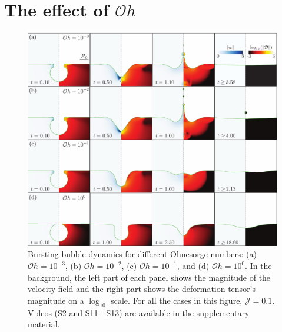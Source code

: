 \documentclass[final]{jfm}
\begin{document}
\section{The effect of $\mathcal{O}h$}\label{App::OhsVariation}
 \begin{figure}
	\centerline{\includegraphics[width=\linewidth]{Figures/FigureB1_Ohvariation-eps-converted-to.pdf}}%
	\caption{Bursting bubble dynamics for different Ohnesorge numbers: (a) $\mathcal{O}h = 10^{-3}$, (b) $\mathcal{O}h = 10^{-2}$, (c) $\mathcal{O}h = 10^{-1}$, and (d) $\mathcal{O}h = 10^{0}$. In the background, the left part of each panel shows the magnitude of the velocity field and the right part shows the deformation tensor's magnitude on a $\log_{10}$ scale. For all the cases in this figure, $\mathcal{J} = 0.1$. Videos (S2 and S11 - S13) are available in the supplementary material.}
	\label{fig:Oh_Variation}
\end{figure}
\end{document}
